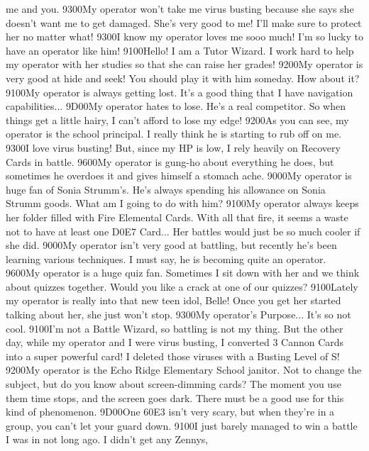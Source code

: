 me and you. 
{93}{00}My operator won't take me virus busting because 
she says she doesn't want me to get damaged. 
She's very good to me! I'll make sure to protect her no matter what! 
{93}{00}I know my operator loves me sooo much! 
I'm so lucky to have an operator like him! 
{91}{00}Hello! I am a Tutor Wizard. I work hard to help my 
operator with her studies so that she can raise her grades! 
{92}{00}My operator is very good at hide and seek! 
You should play it with him someday. How about it? 
{91}{00}My operator is always getting lost. 
It's a good thing that I have navigation capabilities... 
{9D}{00}My operator hates to lose. He's a real competitor. 
So when things get a little hairy, I can't afford to lose my edge! 
{92}{00}As you can see, my operator is the school principal. 
I really think he is starting to rub off on me. 
{93}{00}I love virus busting! But, since my HP is low, 
I rely heavily on Recovery Cards in battle. 
{96}{00}My operator is gung-ho about everything he does, but sometimes he overdoes 
it and gives himself a stomach ache. 
{90}{00}My operator is huge fan of Sonia Strumm's. 
He's always spending his allowance on Sonia Strumm goods. 
What am I going to do with him? 
{91}{00}My operator always keeps her folder filled with Fire Elemental Cards. 
With all that fire, it seems a waste not to have at least one {D0}{E7} Card... 
Her battles would just be so much cooler if she did. 
{90}{00}My operator isn't very good at battling, but recently he's 
been learning various techniques. 
I must say, he is becoming quite an operator. 
{96}{00}My operator is a huge quiz fan. Sometimes I sit down with her and we think 
about quizzes together. Would you like a crack at one of our quizzes? 
{91}{00}Lately my operator is really into that new teen idol, Belle! 
Once you get her started talking about her, she just won't stop. 
{93}{00}My operator's Purpose... It's so not cool. 
{91}{00}I'm not a Battle Wizard, so battling is not my thing. 
But the other day, while my operator and I were virus busting, 
I converted 3 Cannon Cards into a super powerful card! 
I deleted those viruses with a Busting Level of S! 
{92}{00}My operator is the Echo Ridge Elementary School janitor. 
Not to change the subject, but do you know about screen-dimming cards? 
The moment you use them time stops, and the screen goes dark. 
There must be a good use for this kind of phenomenon. 
{9D}{00}One {60}{E3} isn't very scary, but when 
they're in a group, you can't let your guard down. 
{91}{00}I just barely managed to win a battle I was in not long ago. I didn't get any Zennys, 
